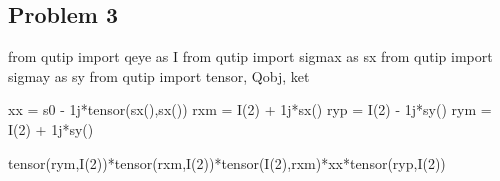 \subsection*{Problem 3}
\begin{python}
from qutip import qeye as I
from qutip import sigmax as sx
from qutip import sigmay as sy
from qutip import tensor, Qobj, ket

xx = s0 - 1j*tensor(sx(),sx())
rxm = I(2) + 1j*sx()
ryp = I(2) - 1j*sy()
rym = I(2) + 1j*sy()

tensor(rym,I(2))*tensor(rxm,I(2))*tensor(I(2),rxm)*xx*tensor(ryp,I(2))
\end{python}
